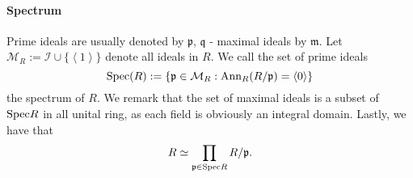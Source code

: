 \paragraph{Spectrum}
Prime ideals are usually denoted by $\mathfrak{p}$, $\mathfrak{q}$ - maximal ideals by $\mathfrak{m}$. Let $\mathcal{M}_R := \mathcal{I} \cup \{\left<1\right>\}$ denote all ideals in $R$. We call the set of prime ideals
$$\mathrm{Spec}(R) := \{\mathfrak{p} \in \mathcal{M}_R : \mathrm{Ann}_R(R/\mathfrak{p}) = \left<0\right>\}$$
the spectrum of $R$. We remark that the set of maximal ideals is a subset of $\mathrm{Spec} R$ in all unital ring, as each field is obviously an integral domain. Lastly, we have that
$$R \simeq \prod_{\mathfrak{p} \in \mathrm{Spec} R} R/\mathfrak{p}.$$